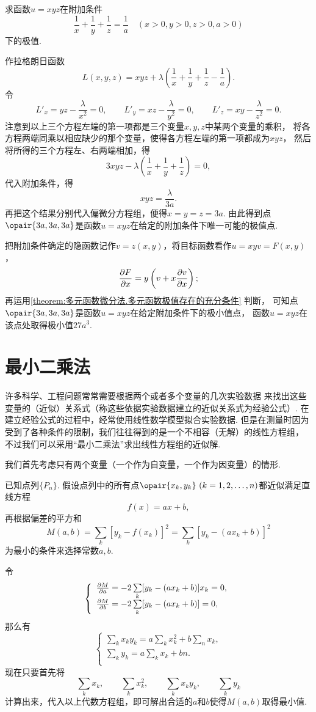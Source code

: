 \begin{example}
求函数\(u=xyz\)在附加条件\[
	\frac{1}{x}+\frac{1}{y}+\frac{1}{z}=\frac{1}{a}
	\quad(x>0,y>0,z>0,a>0)
\]下的极值.
\begin{solution}
作拉格朗日函数\[
	L(x,y,z) = xyz+\lambda\left(\frac{1}{x}+\frac{1}{y}+\frac{1}{z}-\frac{1}{a}\right).
\]
令\[
	L'_x = yz - \frac{\lambda}{x^2} = 0,
	\qquad
	L'_y = xz - \frac{\lambda}{y^2} = 0,
	\qquad
	L'_z = xy - \frac{\lambda}{z^2} = 0.
\]
注意到以上三个方程左端的第一项都是三个变量\(x,y,z\)中某两个变量的乘积，
将各方程两端同乘以相应缺少的那个变量，使得各方程左端的第一项都成为\(xyz\)，
然后将所得的三个方程左、右两端相加，得\[
	3xyz - \lambda\left(\frac{1}{x}+\frac{1}{y}+\frac{1}{z}\right) = 0,
\]
代入附加条件，得\[
	xyz = \frac{\lambda}{3a}.
\]
再把这个结果分别代入偏微分方程组，便得\(x = y = z = 3a\).
由此得到点\(\opair{3a,3a,3a}\)是函数\(u = xyz\)在给定的附加条件下唯一可能的极值点.

把附加条件确定的隐函数记作\(v = z(x,y)\)，将目标函数看作\(u = xyv = F(x,y)\)，\[
\pdv{F}{x} = y\left(v+x\pdv{v}{x}\right);
\]再运用\cref{theorem:多元函数微分法.多元函数极值存在的充分条件} 判断，
可知点\(\opair{3a,3a,3a}\)是函数\(u = xyz\)在给定附加条件下的极小值点，
函数\(u = xyz\)在该点处取得极小值\(27a^3\).
\end{solution}
\end{example}

\section{最小二乘法}
许多科学、工程问题常常需要根据两个或者多个变量的几次实验数据
来找出这些变量的（近似）关系式（称这些依据实验数据建立的近似关系式为经验公式）.
在建立经验公式的过程中，经常使用线性数学模型拟合实验数据.
但是在测量时因为受到了各种条件的限制，我们往往得到的是一个不相容（无解）的线性方程组，
不过我们可以采用“最小二乘法”求出线性方程组的近似解.

我们首先考虑只有两个变量（一个作为自变量，一个作为因变量）的情形.

已知点列\(\{P_n\}\).
假设点列中的所有点\(\opair{x_k,y_k}\ (k=1,2,\dotsc,n)\)都近似满足直线方程\[
	f(x) = a x + b,
\]
再根据偏差的平方和\[
	M(a,b) = \sum\limits_k [y_k - f(x_k)]^2 = \sum\limits_k [y_k - (a x_k + b)]^2
\]为最小的条件来选择常数\(a,b\).

令\[
	\left\{ \begin{array}{l}
		\pdv{M}{a} = -2 \sum\limits_k [y_k - (a x_k + b)] x_k = 0, \\
		\pdv{M}{b} = -2 \sum\limits_k [y_k - (a x_k + b)] = 0,
	\end{array} \right.
\]
那么有\[
	\left\{ \begin{array}{l}
		\sum\limits_k x_k y_k = a \sum\limits_k x_k^2 + b \sum\limits_n x_k, \\
		\sum\limits_k y_k = a \sum\limits_k x_k + b n. \\
	\end{array} \right.
\]
现在只要首先将\[
	\sum\limits_k x_k, \qquad
	\sum\limits_k x_k^2, \qquad
	\sum\limits_k x_k y_k, \qquad
	\sum\limits_k y_k
\]计算出来，代入以上代数方程组，即可解出合适的\(a\)和\(b\)使得\(M(a,b)\)取得最小值.


